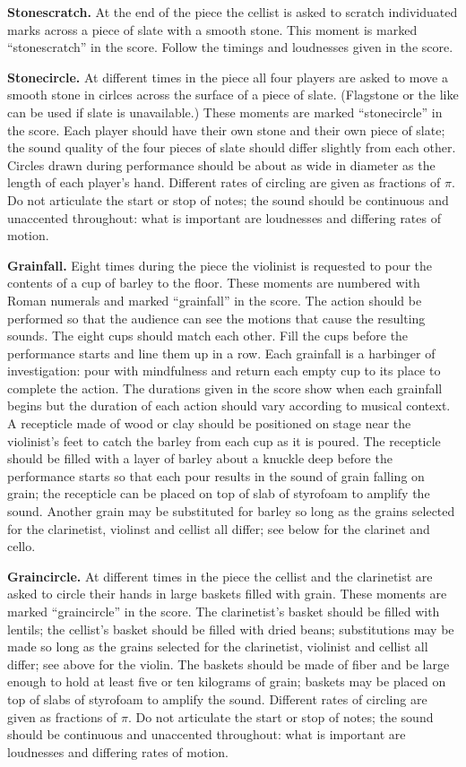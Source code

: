 \documentclass[10pt]{article}
\begin{document}
\begin{textblock}{23}
\textbf{Stonescratch.} At the end of the piece the cellist is asked to scratch
individuated marks across a piece of slate with a smooth stone. This moment is
marked ``stonescratch'' in the score. Follow the timings and loudnesses given
in the score.

\textbf{Stonecircle.} At different times in the piece all four players are
asked to move a smooth stone in cirlces across the surface of a piece of slate.
(Flagstone or the like can be used if slate is unavailable.) These moments are
marked ``stonecircle'' in the score. Each player should have their own stone
and their own piece of slate; the sound quality of the four pieces of slate
should differ slightly from each other. Circles drawn during performance should
be about as wide in diameter as the length of each player's hand. Different
rates of circling are given as fractions of $\pi$. Do not articulate the start
or stop of notes; the sound should be continuous and unaccented throughout:
what is important are loudnesses and differing rates of motion.

\textbf{Grainfall.} Eight times during the piece the violinist is requested to
pour the contents of a cup of barley to the floor. These moments are numbered
with Roman numerals and marked ``grainfall'' in the score. The action should be
performed so that the audience can see the motions that cause the resulting
sounds. The eight cups should match each other. Fill the cups before the
performance starts and line them up in a row. Each grainfall is a harbinger of
investigation: pour with mindfulness and return each empty cup to its place to
complete the action. The durations given in the score show when each grainfall
begins but the duration of each action should vary according to musical
context. A recepticle made of wood or clay should be positioned on stage near
the violinist's feet to catch the barley from each cup as it is poured. The
recepticle should be filled with a layer of barley about a knuckle deep before
the performance starts so that each pour results in the sound of grain falling
on grain; the recepticle can be placed on top of slab of styrofoam to amplify
the sound. Another grain may be substituted for barley so long as the grains
selected for the clarinetist, violinst and cellist all differ; see below for
the clarinet and cello.

\textbf{Graincircle.} At different times in the piece the cellist and the
clarinetist are asked to circle their hands in large baskets filled with grain.
These moments are marked ``graincircle'' in the score. The clarinetist's basket
should be filled with lentils; the cellist's basket should be filled with dried
beans; substitutions may be made so long as the grains selected for the
clarinetist, violinist and cellist all differ; see above for the violin. The
baskets should be made of fiber and be large enough to hold at least five or
ten kilograms of grain; baskets may be placed on top of slabs of styrofoam to
amplify the sound. Different rates of circling are given as fractions of $\pi$.
Do not articulate the start or stop of notes; the sound should be continuous
and unaccented throughout: what is important are loudnesses and differing rates
of motion.


\end{textblock}
\end{document}
